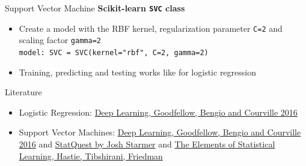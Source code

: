 \documentclass[
                en,
                ]{sdqbeamer}
\begin{document}
\begin{frame}{Support Vector Machine}
    \textbf{Scikit-learn \texttt{SVC} class}
    \begin{itemize}
        \setlength\itemsep{2em}
        \item Create a model with the RBF kernel, regularization parameter
            \texttt{C=2} and scaling factor \texttt{gamma=2} \\
            \texttt{model: SVC = SVC(kernel="rbf", C=2, gamma=2)}
        \item Training, predicting and testing works like for logistic
            regression
    \end{itemize}
\end{frame}

\appendix
\beginbackup

\begin{frame}{Literature}
    \begin{itemize}
        \setlength\itemsep{2em}
        \item Logistic Regression: \href{https://www.deeplearningbook.org/}{Deep
            Learning, Goodfellow, Bengio and Courville 2016}
        \item Support Vector Machines:
            \href{https://www.deeplearningbook.org/}{Deep Learning, Goodfellow,
            Bengio and Courville 2016} and
            \href{https://www.youtube.com/watch?v=efR1C6CvhmE}{StatQuest by Josh
            Starmer} and
            \href{https://link.springer.com/book/10.1007/978-0-387-84858-7}{The
            Elements of Statistical Learning, Hastie, Tibshirani, Friedman}
    \end{itemize}
\end{frame}

\backupend
\end{document}

